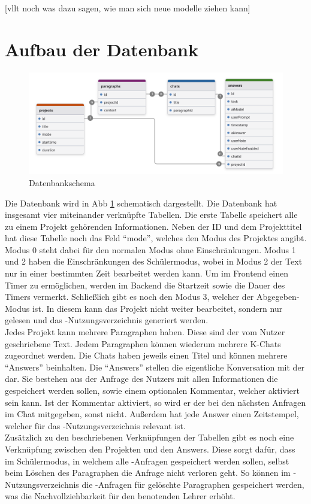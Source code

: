 \documentclass[../main.tex]{subfiles}
\begin{document}
[vllt noch was dazu sagen, wie man sich neue modelle ziehen kann]

\section{Aufbau der Datenbank}
\begin{figure}[h!]
  \includegraphics[scale=0.14]{bilder/Datenbank.png}
  \caption{Datenbankschema}
  \label{fig:data}
\end{figure}
Die Datenbank wird in Abb \ref{fig:data} schematisch dargestellt. Die Datenbank hat insgesamt vier miteinander verknüpfte Tabellen. Die erste Tabelle speichert alle zu einem Projekt gehörenden 
Informationen. Neben der ID und dem Projekttitel hat diese Tabelle noch das Feld "`mode"', welches den Modus des Projektes angibt. Modus 0 steht dabei für den normalen Modus ohne 
Einschränkungen. Modus 1 und 2 haben die Einschränkungen des Schülermodus, wobei in Modus 2 der Text nur in einer bestimmten Zeit bearbeitet werden kann. Um im Frontend einen Timer 
zu ermöglichen, werden im Backend die Startzeit sowie die Dauer des Timers vermerkt. Schließlich gibt es noch den Modus 3, welcher der Abgegeben-Modus ist. In diesem kann das Projekt 
nicht weiter bearbeitet, sondern nur gelesen und das -Nutzungsverzeichnis generiert werden.\\
Jedes Projekt kann mehrere Paragraphen haben. Diese sind der vom Nutzer geschriebene Text. Jedem Paragraphen können wiederum mehrere K-Chats zugeordnet werden. Die Chats haben 
jeweils einen Titel und können mehrere "`Answers"' beinhalten. Die "`Answers"' stellen die eigentliche Konversation mit der  dar. Sie bestehen aus der Anfrage des Nutzers mit allen 
Informationen die gespeichert werden sollen, sowie einem optionalen Kommentar, welcher aktiviert sein kann. Ist der Kommentar aktiviert, so wird er der  bei den nächsten Anfragen 
im Chat mitgegeben, sonst nicht. Außerdem hat jede Answer einen Zeitstempel, welcher für das -Nutzungsverzeichnis relevant ist.\\
Zusätzlich zu den beschriebenen Verknüpfungen der Tabellen gibt es noch eine Verknüpfung zwischen den Projekten und den Answers. Diese sorgt dafür, dass im Schülermodus, in welchem 
alle -Anfragen gespeichert werden sollen, selbst beim Löschen des Paragraphen die Anfrage nicht verloren geht. So können im -Nutzungsverzeichnis die -Anfragen für gelöschte 
Paragraphen gespeichert werden, was die Nachvollziehbarkeit für den benotenden Lehrer erhöht.
\end{document}

